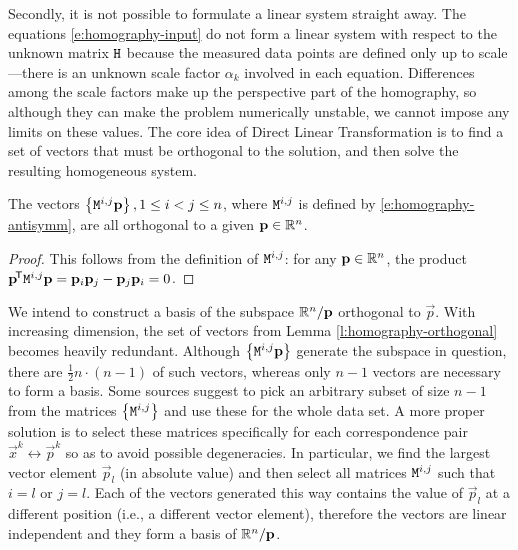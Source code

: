 Secondly, it is not possible to formulate a linear system straight away.
The equations \eqref{e:homography-input} do not form a linear system with respect to the unknown matrix $\mathtt{H}$ because the measured data points are defined only up to scale---there is an unknown scale factor $\alpha_k$ involved in each equation.
Differences among the scale factors make up the perspective part of the homography, so although they can make the problem numerically unstable, we cannot impose any limits on these values.
The core idea of Direct Linear Transformation is to find a set of vectors that must be orthogonal to the solution, and then solve the resulting homogeneous system.

\begin{lemma} \label{l:homography-orthogonal}
The vectors $\left\{ \mathtt{M}^{i, j} \mathbf{p} \right\}, 1 \leq i < j \leq n$, where $\mathtt{M}^{i,j}$ is defined by \eqref{e:homography-antisymm}, are all orthogonal to a given $\mathbf{p} \in \mathbb{R}^n$.
\end{lemma}
\begin{proof}
This follows from the definition of $\mathtt{M}^{i,j}$: for any $\mathbf{p} \in \mathbb{R}^n$, the product $\mathbf{p}^{\!\mathsf{T}} \mathtt{M}^{i, j} \mathbf{p} = \mathbf{p}_{i} \mathbf{p}_{j} - \mathbf{p}_{j} \mathbf{p}_{i} = 0$.
\end{proof}

We intend to construct a basis of the subspace $\mathbb{R}^n / \mathbf{p}$ orthogonal to $\vec p$.
With increasing dimension, the set of vectors from Lemma \ref{l:homography-orthogonal} becomes heavily redundant.
Although $\left\{ \mathtt{M}^{i, j} \mathbf{p} \right\}$ generate the subspace in question, there are $\frac {1} {2} n \cdot (n - 1)$ of such vectors, whereas only $n-1$ vectors are necessary to form a basis.
Some sources suggest to pick an arbitrary subset of size $n - 1$ from the matrices $\left\{ \mathtt{M}^{i, j} \right\}$ and use these for the whole data set.\cite{hartley03}
A more proper solution is to select these matrices specifically for each correspondence pair $\vec x^k \leftrightarrow \vec p^k$ so as to avoid possible degeneracies.
In particular, we find the largest vector element $\vec p_l$ (in absolute value) and then select all matrices $\mathtt{M}^{i, j}$ such that $i = l$ or $j = l$.
Each of the vectors generated this way contains the value of $\vec p_l$ at a different position (i.e., a different vector element), therefore the vectors are linear independent and they form a basis of $\mathbb{R}^n / \mathbf{p}$.

